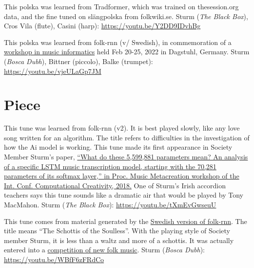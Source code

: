 \documentclass[a4paper,notitlepage,twoside]{book}
\begin{document}
{}  
\hypertarget{polska:UgglasPolska}{}
This polska was learned from Tradformer, which was trained on thesession.org data,
and the fine tuned on slängpolska from folkwiki.se.
Sturm ({\em The Black Box}), Cros Vila (flute), Casini (harp): \url{https://youtu.be/Y2DD9IDvhBg}

{}  
\hypertarget{polska:DagstuhlDawgs}{}
This polska was learned from folk-rnn (v/ Swedish), in commemoration of a \href{https://www.dagstuhl.de/no_cache/en/program/calendar/semhp/?semnr=22082}{workshop in music informatics}
held Feb 20-25, 2022 in Dagstuhl, Germany.
Sturm ({\em Bosca Dubh}), Bittner (piccolo), Balke (trumpet): \url{https://youtu.be/vjeULaGp7JM}


\clearpage
\section{Piece}
{}
\hypertarget{piece:WhyAreYou}{}
This tune was learned from folk-rnn (v2). 
It is best played slowly, like any love song written for an algorithm.
The title refers to difficulties in the investigation of how the Ai model is working.
This tune made its first appearance in Society Member Sturm's paper, 
\href{http://urn.kb.se/resolve?urn=urn:nbn:se:kth:diva-238604}
{``What do these 5,599,881 parameters mean? 
An analysis of a specific LSTM music transcription model, 
starting with the 70,281 parameters of its softmax layer,” 
in Proc. Music Metacreation workshop of the Int. Conf. Computational Creativity, 2018.}
One of Sturm's Irish accordion teachers says this tune sounds like a dramatic air
that would be played by Tony MacMahon.
Sturm ({\em The Black Box}): \url{https://youtu.be/tXmEvGwseuU}

{}  
  
\hypertarget{piece:SjallosasSchottis}{}
This tune comes from material generated by the \href{https://themachinefolksession.org/tune/1012}{Swedish version of folk-rnn}.
The title means ``The Schottis of the Soulless''.
With the playing style of Society member Sturm, it is less than a waltz and more of a schottis.
It was actually entered into a \href{https://www.stallet.st/sv/latskrivartavling}{competition of new folk music}.
Sturm ({\em Bosca Dubh}): \url{https://youtu.be/WBfF6zFRdCo}
\end{document}
